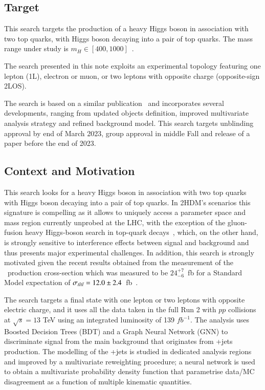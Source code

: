 \subsection{Target} 

This search targets the production of a heavy Higgs boson in association with two top quarks, with Higgs boson decaying into a pair of top quarks.  
The mass range under study is $m_H\in [400,1000]$~\GeV. 

The search presented in this note exploits an experimental topology featuring one lepton (1L), electron or muon, or two leptons with opposite charge (opposite-sign 2LOS).

The search is based on a similar publication~\cite{ATLAS:2021kqb} and incorporates several developments, 
ranging from updated objects definition, improved multivariate analysis strategy and 
refined background model. This search targets unblinding approval by end of March 2023, group approval in middle Fall and release of a paper before the end of 2023. 

\subsection{Context and Motivation} 

This search looks for a heavy Higgs boson in association with two top quarks with Higgs boson decaying into a pair of top quarks. In 2HDM's scenarios this signature is 
compelling as it allows to uniquely access a parameter space and mass region currently unprobed at the LHC, with the exception of the gluon-fusion heavy Higgs-boson search in top-quark decays~\cite{Aaboud:2017hnm}, which, on the other hand, is strongly sensitive to interference effects between signal and background and thus presents major experimental challenges.  In addition, this search is strongly motivated given the recent results obtained from the measurement of the \tttt~production cross-section 
which was measured to be $24^{+7}_{-6}$~fb for a Standard Model expectation of  $\sigma_{t\bar{t}t\bar t }=12.0\pm2.4$~fb~\cite{ATLAS:2021kqb}.   

The search targets a final state with one lepton or two leptons with opposite electric charge, and it uses all the data taken  in the full Run 2  with $pp$ collisions at $\sqrt{s} = 13$ TeV using an integrated luminosity of 139 $fb^{-1}$. The analysis uses Boosted Decision Trees (BDT) and a Graph Neural Network (GNN) to discriminate signal from the main background that originates from \ttbar+jets production. 
The modelling of the \ttbar+jets is studied in dedicated analysis regions and improved by a multivariate reweighting procedure; a neural network is used to obtain a multivariate probability density function that parametrise data/MC disagreement as a function of multiple kinematic quantities.   


